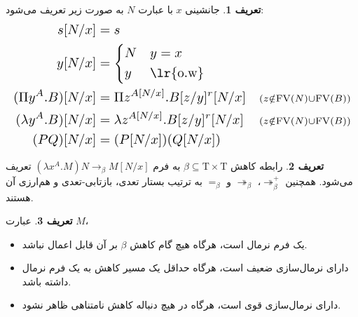 \documentclass[11pt,twocolumn,a4paper,twoside]{article}
\theoremstyle{definition}
\newtheorem{definition}{تعریف}[section]
\theoremstyle{theorem}
\theoremstyle{definition}
\theoremstyle{definition}
\theoremstyle{definition}
\theoremstyle{definition}
\theoremstyle{definition}
\newcommand{\resizedalign}[1]{%
  \[
  \resizebox{\columnwidth}{!}{$
    \begin{aligned}
      #1
    \end{aligned}
  $}
  \]
}
\begin{document}
\begin{definition}\label{subst}
جانشینی $x$ با عبارت $N$ به صورت زیر تعریف می‌شود:
\vspace{-5pt}
\resizedalign{
s[N/x] &= s\\
y[N/x] &=
\begin{cases*}
N &$y=x$\\
y &\text{\lr{o.w}}
\end{cases*}\\
(\Pi y^A.B)[N/x] &= \Pi z^{A[N/x]}.B[z/y]^r[N/x] &{\scriptstyle(z \notin \operatorname{FV}(N) \cup \operatorname{FV}(B))}\\
(\lambda y^A.B)[N/x] &= \lambda z^{A[N/x]}.B[z/y]^r[N/x] &{\scriptstyle(z \notin \operatorname{FV}(N) \cup \operatorname{FV}(B))}\\
(PQ)[N/x]&=(P[N/x])(Q[N/x])\\
}
\end{definition}

\begin{definition}
رابطه کاهش $\beta \subseteq \mathrm{T} \times \mathrm{T}$ به فرم
$(\lambda x^A.M)N \rightarrow_{\beta} M[N/x]$
تعریف می‌شود.
همچنین $\twoheadrightarrow^{+}_{\beta}$، $\twoheadrightarrow_{\beta}$ و $=_{\beta}$ به ترتیب بستار تعدی، بازتابی-تعدی و هم‌ارزی آن هستند.
\end{definition}

\begin{definition}
عبارت $M$،
\begin{itemize}[noitemsep, topsep=0pt]
\item[-] یک فرم نرمال است، هرگاه هیچ گام کاهش $\beta$ بر آن قابل اعمال نباشد.
\item[-] دارای نرمال‌سازی ضعیف است، هرگاه حداقل یک مسیر کاهش به یک فرم نرمال داشته باشد.
\item[-] دارای نرمال‌سازی قوی است، هرگاه در هیچ دنباله کاهش نامتناهی ظاهر نشود.
\end{itemize}
\end{definition}
\end{document}
